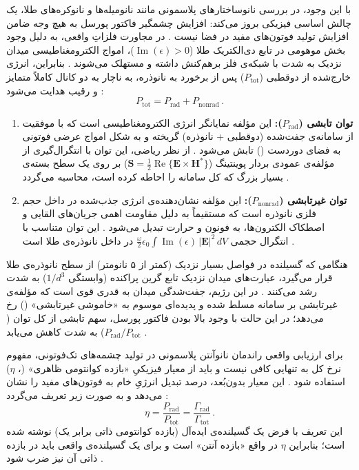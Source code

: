 \documentclass[12pt,a4paper]{report}
\newcommand{\sub}[1]{\mathrm{#1}}               %
\newcommand{\Imag}{\operatorname{Im}}
\newcommand{\Real}{\operatorname{Re}}
\begin{document}
با این وجود، در بررسی نانوساختارهای پلاسمونی مانند نانومیله‌ها و نانوکره‌های طلا، یک چالش اساسی فیزیکی بروز می‌کند: افزایش چشمگیر فاکتور پورسل به هیچ وجه ضامن افزایش تولید فوتون‌های مفید در فضا نیست \cite{koenderink,novotny}. در مجاورت فلزاتِ واقعی، به دلیل وجود بخش موهومی در تابع دی‌الکتریک طلا ($\Imag(\epsilon)>0$)، امواج الکترومغناطیسی میدان نزدیک به شدت با شبکه‌ی فلز برهم‌کنش داشته و مستهلک می‌شوند \cite{maier,novotny}. بنابراین، انرژی خارج‌شده از دوقطبی ($P_{\sub{tot}}$) پس از برخورد به نانوذره، به ناچار به دو کانال کاملاً متمایز و رقیب هدایت می‌شود \cite{novotny,anger}:
\begin{equation}
P_{\sub{tot}}=P_{\sub{rad}}+P_{\sub{nonrad}}\,.
\end{equation}
\begin{enumerate}
\item \textbf{توان تابشی ($P_{\sub{rad}}$):} این مؤلفه نمایانگر انرژی الکترومغناطیسی است که با موفقیت از سامانه‌ی جفت‌شده (دوقطبی + نانوذره) گریخته و به شکل امواج عرضی فوتونی به فضای دوردست () تابش می‌شود \cite{novotny}. از نظر ریاضی، این توان با انتگرال‌گیری از مؤلفه‌ی عمودی بردار پوینتینگ ($\mathbf{S}=\tfrac{1}{2}\Real\{\mathbf{E}\times\mathbf{H}^*\}$) بر روی یک سطح بسته‌ی بسیار بزرگ که کل سامانه را احاطه کرده است، محاسبه می‌گردد \cite{novotny}.
\item \textbf{توان غیرتابشی ($P_{\sub{nonrad}}$):} این مؤلفه نشان‌دهنده‌ی انرژی جذب‌شده در داخل حجم فلزی نانوذره است که مستقیماً به دلیل مقاومت اهمی جریان‌های القایی و اصطکاک الکترون‌ها، به فونون و حرارت تبدیل می‌شود \cite{novotny,maier}. این توان متناسب با انتگرال حجمی $\tfrac{\omega}{2}\epsilon_0\int\Imag(\epsilon)\,|\mathbf{E}|^2\,dV$ در داخل نانوذره‌ی طلا است \cite{novotny}.
\end{enumerate}
هنگامی که گسیلنده در فواصل بسیار نزدیک (کمتر از ۵ نانومتر) از سطح نانوذره‌ی طلا قرار می‌گیرد، عبارت‌های میدان نزدیک تابع گرین پراکنده (وابستگی $1/d^3$) به شدت رشد می‌کنند \cite{novotny,anger}. در این رژیم، جفت‌شدگی میدان به قدری قوی است که مؤلفه‌ی غیرتابشی بر سامانه مسلط شده و پدیده‌ای موسوم به «خاموشی غیرتابشی» () رخ می‌دهد؛ در این حالت با وجود بالا بودن فاکتور پورسل، سهم تابشی از کل توان ($P_{\sub{rad}}/P_{\sub{tot}}$) به شدت کاهش می‌یابد \cite{novotny,anger}.

برای ارزیابی واقعی راندمان نانوآنتن پلاسمونی در تولید چشمه‌های تک‌فوتونی، مفهوم نرخ کل به تنهایی کافی نیست و باید از معیار فیزیکیِ «بازده کوانتومی ظاهری» (، $\eta$) استفاده شود \cite{novotny,koenderink}. این معیار بدون‌بُعد، درصد تبدیل انرژیِ خام به فوتون‌های مفید را نشان می‌دهد و به صورت زیر تعریف می‌گردد \cite{novotny}:
\begin{equation}\label{eq:eta}
\eta=\frac{P_{\sub{rad}}}{P_{\sub{tot}}}=\frac{\Gamma_{\sub{rad}}}{\Gamma_{\sub{tot}}}\,.
\end{equation}
این تعریف با فرض یک گسیلنده‌ی ایده‌آل (بازده کوانتومی ذاتی برابر یک) نوشته شده است؛ بنابراین $\eta$ در واقع «بازده آنتن» است و برای یک گسیلنده‌ی واقعی باید در بازده ذاتی آن نیز ضرب شود \cite{koenderink,novotny}.
\end{document}
